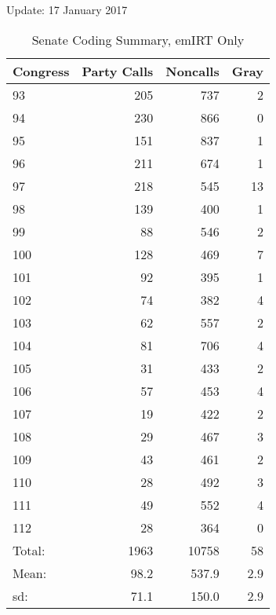 \documentclass[12pt]{article}
\begin{document}
	

\begin{center}
	Update: 17 January 2017
\end{center}





\begin{table}[ht]
	\caption{Senate Coding Summary, emIRT Only}
	\centering
	\begin{tabular}{lrrr}
		\hline
		Congress & Party Calls & Noncalls & Gray \\ 
		\hline
		93 & 205 & 737 &   2 \\ 
		94 & 230 & 866 &   0 \\ 
		95 & 151 & 837 &   1 \\ 
		96 & 211 & 674 &   1 \\ 
		97 & 218 & 545 &  13 \\ 
		98 & 139 & 400 &   1 \\ 
		99 &  88 & 546 &   2 \\ 
		100 & 128 & 469 &   7 \\ 
		101 &  92 & 395 &   1 \\ 
		102 &  74 & 382 &   4 \\ 
		103 &  62 & 557 &   2 \\ 
		104 &  81 & 706 &   4 \\ 
		105 &  31 & 433 &   2 \\ 
		106 &  57 & 453 &   4 \\ 
		107 &  19 & 422 &   2 \\ 
		108 &  29 & 467 &   3 \\ 
		109 &  43 & 461 &   2 \\ 
		110 &  28 & 492 &   3 \\ 
		111 &  49 & 552 &   4 \\ 
		112 &  28 & 364 &   0 \\ 
		\hline
		Total: & 1963 & 10758 & 58 \\
		Mean: & 98.2 & 537.9 & 2.9 \\
		sd: & 71.1 & 150.0 & 2.9 \\
		\hline
	\end{tabular}
\end{table}
\end{document}
